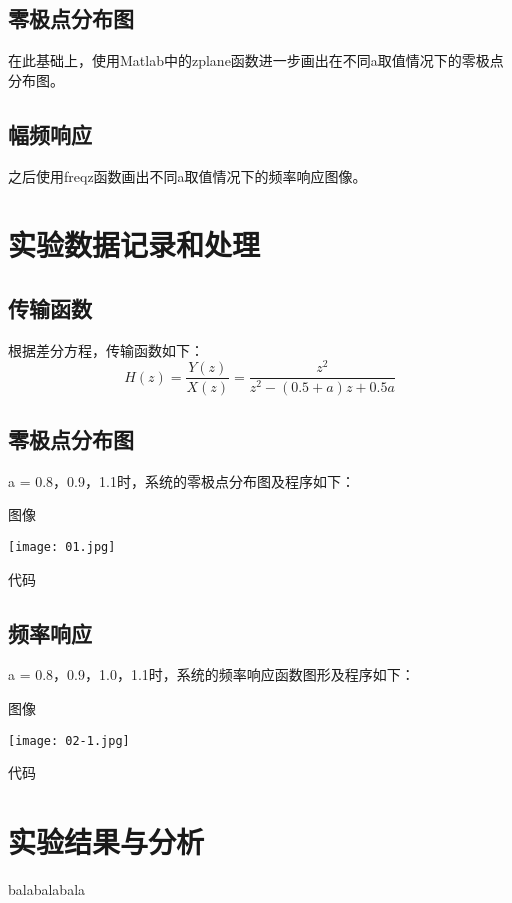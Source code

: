 \documentclass{zjureport}
\begin{document}
  \subsection{零极点分布图}
    在此基础上，使用Matlab中的zplane函数进一步画出在不同a取值情况下的零极点分布图。
  \subsection{幅频响应}
    之后使用freqz函数画出不同a取值情况下的频率响应图像。

\section{实验数据记录和处理}
  \subsection{传输函数}
    根据差分方程，传输函数如下：
    $$H(z) = \frac{Y(z)}{X(z)} = \frac{z^2}{z^2-(0.5+a)z+0.5a}$$
  \subsection{零极点分布图}
    a = 0.8，0.9，1.1时，系统的零极点分布图及程序如下：
    \begin{clause}
      \item 图像
      \begin{center}
        \texttt{[image: 01.jpg]}
      \end{center}
      \item 代码
      
    \end{clause}

  \subsection{频率响应}
    a = 0.8，0.9，1.0，1.1时，系统的频率响应函数图形及程序如下：
    \begin{clause}
      \item 图像
      \begin{center}
        \texttt{[image: 02-1.jpg]}
      \end{center}
      \item 代码
      
    \end{clause}

\section{实验结果与分析}

balabalabala
\end{document}
